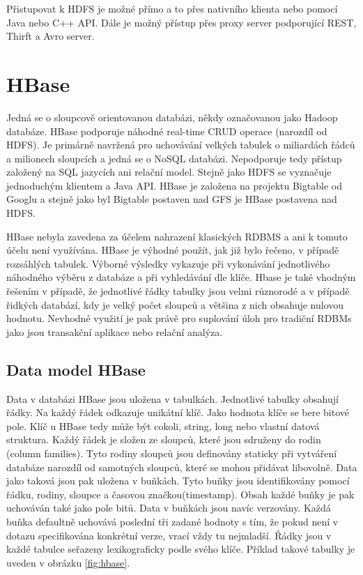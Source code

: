 \documentclass[thesis=M,czech]{FITthesis}[2012/06/26]
\begin{document}
Přistupovat k HDFS je možné přímo a to přes nativního klienta nebo pomocí Java nebo C++ API. Dále je možný přístup přes proxy server podporující REST, Thirft a Avro server.

\section{HBase}
Jedná se o sloupcově orientovanou databázi, někdy označovanou jako Hadoop databáze. HBase podporuje náhodné real-time CRUD operace (narozdíl od HDFS). Je primárně navržená pro uchovávání velkých tabulek o miliardách řádců a milionech sloupcích a jedná se o NoSQL databázi. Nepodporuje tedy přístup založený na SQL jazycích ani relační model. Stejně jako HDFS se vyznačuje jednoduchým klientem a Java API. HBase je založena na projektu Bigtable od Googlu a stejně jako byl Bigtable postaven nad GFS je HBase postavena nad HDFS.\cite{HbaseDG}

HBase nebyla zavedena za účelem nahrazení klasických RDBMS a ani k tomuto účelu není využívána. HBase je výhodné použít, jak již bylo řečeno, v případě rozsáhlých tabulek. Výborné výsledky vykazuje při vykonávání jednotlivého náhodného výběru z databáze a při vyhledávání dle klíče. Hbase je také vhodným řešením v případě, že jednotlivé řádky tabulky jsou velmi různorodé a v případě řidkých databází, kdy je velký počet sloupců a většina z nich obsahuje nulovou hodnotu. Nevhodné využití je pak právě pro suplování úloh pro tradiční RDBMs jako jsou transakční aplikace nebo relační analýza.\cite{HBaseWEB}

\subsection{Data model HBase}


Data v databázi HBase jsou uložena v tabulkách. Jednotlivé tabulky obsahují řádky. Na každý řádek odkazuje unikátní klíč. Jako hodnota klíče se bere bitové pole. Klíč u HBase tedy může být cokoli, string, long nebo vlastní datová struktura. Každý řádek je složen ze sloupců, které jsou sdruženy do rodin (column families). Tyto rodiny sloupců jsou definovány staticky při vytváření databáze narozdíl od samotných sloupců, které se mohou přidávat libovolně. Data jako taková jsou pak uložena v buňkách. Tyto buňky jsou identifikovány pomocí řádku, rodiny, sloupce a časovou značkou(timestamp). Obsah každé buňky je pak uchováván také jako pole bitů. Data v buňkách jsou navíc verzovány. Každá buňka defaultně uchovává poslední tři zadané hodnoty s tím, že pokud není v dotazu specifikována konkrétní verze, vrací vždy tu nejmladší. Řádky jsou v každé tabulce seřazeny lexikograficky podle svého klíče. Příklad takové tabulky je uveden v obrázku \ref{fig:hbase}.
\end{document}
